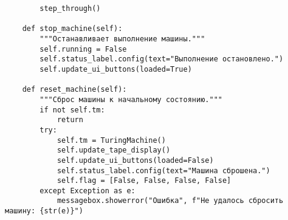 \begin{lstlisting}
        step_through()

    def stop_machine(self):
        """Останавливает выполнение машины."""
        self.running = False
        self.status_label.config(text="Выполнение остановлено.")
        self.update_ui_buttons(loaded=True)

    def reset_machine(self):
        """Сброс машины к начальному состоянию."""
        if not self.tm:
            return
        try:
            self.tm = TuringMachine()
            self.update_tape_display()
            self.update_ui_buttons(loaded=False)
            self.status_label.config(text="Машина сброшена.")
            self.flag = [False, False, False, False]
        except Exception as e:
            messagebox.showerror("Ошибка", f"Не удалось сбросить машину: {str(e)}")
\end{lstlisting}
